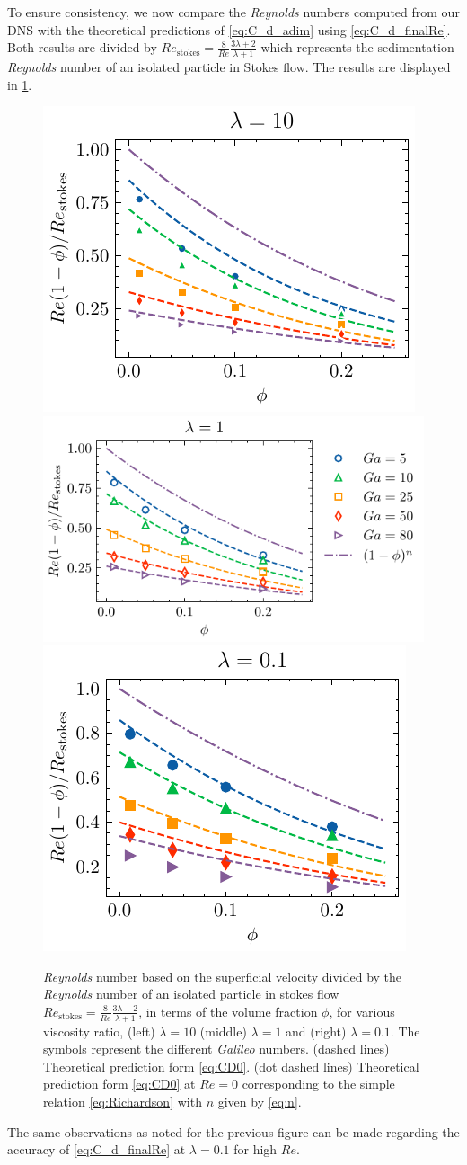 To ensure consistency, we now compare the \textit{Reynolds} numbers computed from our DNS with the theoretical predictions of \ref{eq:C_d_adim} using \ref{eq:C_d_finalRe}. 
Both results are divided by $Re_\text{stokes} = \frac{8}{Re} \frac{3\lambda +2}{\lambda+1}$ which represents the sedimentation \textit{Reynolds} number of an isolated particle in Stokes flow.  
The results are displayed in \ref{fig:Reasim}. 
\begin{figure}[h!]
    \centering
    \includegraphics[height = 0.23\textwidth]{image/HOMOGENEOUS_final/CA/U_l_10.pdf}
    \includegraphics[height = 0.23\textwidth]{image/HOMOGENEOUS_final/CA/U_l_1.pdf}
    \includegraphics[height = 0.23\textwidth]{image/HOMOGENEOUS_final/CA/U_l_0.pdf}
    \caption{
        \textit{Reynolds} number based on the superficial velocity divided by the \textit{Reynolds} number of an isolated particle in stokes flow $Re_\text{stokes}= \frac{8}{Re} \frac{3\lambda +2}{\lambda+1}$, in terms of the volume fraction $\phi$, for various viscosity ratio, (left) $\lambda  = 10$ (middle) $\lambda =1$ and (right) $\lambda = 0.1$. 
        The symbols represent the different \textit{Galileo} numbers. 
        (dashed lines) Theoretical prediction form \ref{eq:CD0}. 
        (dot dashed lines) Theoretical prediction form \ref{eq:CD0} at $Re = 0$ corresponding to the simple relation \ref{eq:Richardson} with $n$ given by \ref{eq:n}. 
    }
    \label{fig:Reasim}
\end{figure}
The same observations as noted for the previous figure can be made regarding the accuracy of \ref{eq:C_d_finalRe} at $\lambda = 0.1$ for high $Re$. 

